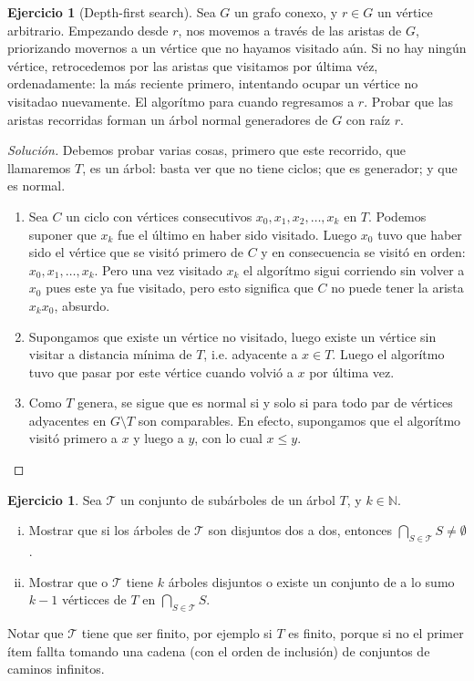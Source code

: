 \documentclass[12pt]{report}
\theoremstyle{plain}
\theoremstyle{definition}
\newtheorem{exercise}[theorem]{Ejercicio}
\newenvironment{solution}{\begin{proof}[Solución]}{\end{proof}}
\newcommand{\naturals}{\mathbb{N}}
\begin{document}
\begin{exercise}[Depth-first search]
Sea $G$ un grafo conexo, y $r \in G$ un vértice arbitrario. Empezando desde $r$, nos movemos a través de las aristas
de $G$, priorizando movernos a un vértice que no hayamos visitado aún. Si no hay ningún vértice, retrocedemos por las
 aristas que visitamos por última véz, ordenadamente: la más reciente primero, intentando ocupar un vértice no
 visitadao nuevamente. El algorítmo para cuando regresamos a $r$. Probar que las aristas recorridas forman un árbol
 normal generadores de $G$ con raíz $r$.
\end{exercise}
 \begin{solution}
 Debemos probar varias cosas, primero que este recorrido, que llamaremos $T$, es un árbol: basta ver que no tiene
 ciclos;
  que
  es generador; y que es
  normal.
  \begin{enumerate}[1.]
  \item Sea $C$ un ciclo con vértices consecutivos $x_0, x_1, x_2 , \ldots, x_k$ en $T$. Podemos suponer que $x_k$ fue
   el último en haber sido visitado. Luego $x_0$ tuvo que haber sido el vértice que se visitó primero de $C$ y en
   consecuencia se visitó en orden: $x_0, x_1, \ldots, x_k$. Pero una vez visitado $x_k$ el algorítmo sigui corriendo
    sin volver a $x_0$ pues este ya fue visitado, pero esto significa que $C$ no puede tener la arista $x_k x_0$,
    absurdo.
  \item Supongamos que existe un vértice no visitado, luego existe un vértice sin visitar a distancia mínima de $T$,
  i.e. adyacente a $x \in T$. Luego el algorítmo tuvo que pasar por este vértice cuando volvió a $x$ por última vez.
    \item Como $T$ genera, se sigue que es normal si y solo si para todo par de vértices adyacentes en $G \setminus T$ son comparables. En efecto, supongamos que el algorítmo visitó primero a $x$ y luego a $y$, con lo cual $x \leq y$.
  \end{enumerate}
 \end{solution}

 \begin{exercise}
     Sea $\mathcal T$ un conjunto de subárboles de un árbol $T$, y $k \in \naturals$.
     \begin{enumerate}[(i)]
     \item Mostrar que si los árboles de $\mathcal T$ son disjuntos dos a dos, entonces $\bigcap_{S \in \mathcal T} S \neq \emptyset$.
     \item Mostrar que o $\mathcal T$ tiene $k$ árboles disjuntos o existe un conjunto de a lo sumo $k-1$ vérticces
     de $T$ en $\bigcap_{S \in \mathcal T} S$.
     \end{enumerate}
 \end{exercise}
 Notar que $\mathcal T$ tiene que ser finito, por ejemplo si $T$ es finito, porque si no el primer ítem fallta
 tomando una cadena (con el orden de inclusión) de conjuntos de caminos infinitos.
\end{document}
